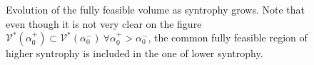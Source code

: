 \documentclass[12pt, titlepage]{report}
\begin{document}
\begin{figure}[h]
\hspace{-0.1\linewidth}
\begin{center}
\end{center}
\caption{Evolution of the fully feasible volume as syntrophy grows. Note that even though it is not very clear on the figure $\mathcal{V}^*(\alpha_0^+) \subset \mathcal{V}^*(\alpha_0^-) \ \forall \alpha_0^+ > \alpha_0^-$, \ie the common fully feasible region of higher syntrophy is included in the one of lower syntrophy.}
\end{figure}
\end{document}
